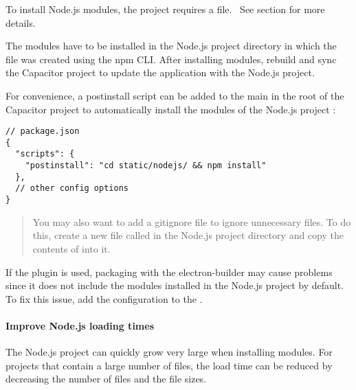 To install Node.js modules, the project requires a  file.~\cite{npm}
See section  for more details.

The modules have to be installed in the Node.js project directory in which the  file was created using the npm CLI\@.
After installing modules, rebuild and sync the Capacitor project to update the application with the Node.js project.

For convenience, a postinstall script can be added to the main  in the root of the Capacitor project to automatically install the modules of the Node.js project \cite{npm}:

\begin{verbatim}
// package.json
{
  "scripts": {
    "postinstall": "cd static/nodejs/ && npm install"
  },
  // other config options
}
\end{verbatim}

\begin{quote}
  You may also want to add a gitignore file to ignore unnecessary files.
  To do this, create a new file called  in the Node.js project directory and copy the contents of  into it.
\end{quote}

\begin{important}[Important]
  If the  plugin is used, packaging with the electron-builder may cause problems since it does not include the modules installed in the Node.js project by default. \cite{electron-builder}
  \\[1em]
  To fix this issue, add the configuration  to the .
  \cite{electron-builder}
\end{important}

\newpage

\paragraph{Improve Node.js loading times}
\label{sec:Capacitor-NodeJS:ImproveLoadingTimes}

The Node.js project can quickly grow very large when installing modules.
For projects that contain a large number of files, the load time can be reduced by decreasing the number of files and the file sizes.
\cite{nodejs-mobile:docs}

